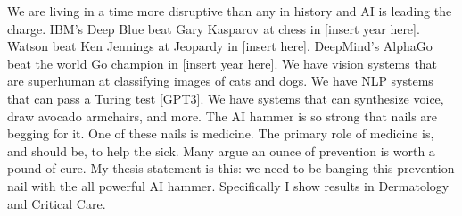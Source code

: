 We are living in a time more disruptive than any in history and AI is leading the charge.  IBM's Deep Blue beat Gary Kasparov at chess in [insert year here].  Watson beat Ken Jennings at Jeopardy in [insert here].  DeepMind's AlphaGo beat the world Go champion in [insert year here].  We have vision systems that are superhuman at classifying images of cats and dogs.  We have NLP systems that can pass a Turing test [GPT3].  We have systems that can synthesize voice, draw avocado armchairs, and more.  The AI hammer is so strong that nails are begging for it.  One of these nails is medicine. The primary role of medicine is, and should be, to help the sick.  Many argue an ounce of prevention is worth a pound of cure.  My thesis statement is this: we need to be banging this prevention nail with the all powerful AI hammer.  Specifically I show results in Dermatology and Critical Care.